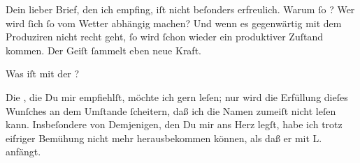 \pstart
           Dein lieber Brief, den ich \label{K_L03230-2v}\label{K_L03230-2} empfing, iſt nicht beſonders erfreulich. Warum{ }ſo \label{K_L03230-3v}\label{K_L03230-3}? Wer wird{ }ſich{ }ſo vom Wetter
               abhängig machen? Und wenn es gegenwärtig mit dem Produziren nicht recht geht,{ }ſo wird{ }ſchon {\pb}wieder ein produktiver Zuſtand kommen. Der
               Geiſt{ }ſammelt eben neue Kraft.\pend
           
\pstart
           Was iſt mit der \label{K_L03230-4v}\label{K_L03230-4}?\pend
           
\pstart
           Die \label{K_L03230-5v}\label{K_L03230-5}, die Du mir empfiehlſt, möchte ich
               gern leſen; nur wird die Erfüllung dieſes Wunſches an dem Umſtande{ }ſcheitern, daß ich
               die Namen zumeiſt nicht leſen kann. Insbeſondere von Demjenigen, den Du mir ans Herz
               legſt, habe ich trotz eifriger Bemühung nicht mehr herausbekommen können, als daß er
               mit \textsc{L.}{ }{\pb}anfängt.\pend
           
